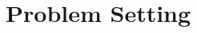 \documentclass[thesis.tex]{subfiles}
\newcommand{\Zowa}{Z^{\textit{owa}}}
\begin{document}


\vspace{-0.1in}
\section{Problem Setting}
\label{sec:owa:problem}
\end{document}
